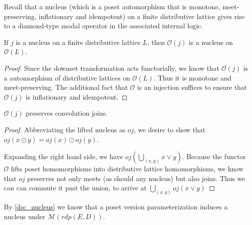\documentclass[hoptionsi,review,format=sigplan]{acmart}
\theoremstyle{definition}
\newcommand{\Mcc}{\mathcal{M}}
\newcommand{\Oc}{\mathcal{O}}
\begin{document}
Recall that a nucleus (which is a poset automorphism that is monotone, meet-preserving, inflationary and idempotent) on a finite distributive lattice gives rise to a diamond-type modal operator in the associated internal logic.

\begin{lemma}
If \(j\) is a nucleus on a finite distributive lattice \(L\), then \(\Oc(j)\) is a nucleus on \(\Oc(L)\).
\end{lemma}

\begin{proof}
Since the downset transformation acts functorially, we know that \(\Oc(j)\) is a automorphism of distributive lattices on \(\Oc(L)\). Thus it is monotone and meet-preserving. The additional fact that \(\Oc\) is an injection suffices to ensure that \(\Oc(j)\) is inflationary and idempotent.
\end{proof}

\begin{lemma}
\(\Oc(j)\) preserves convolution joins.
\end{lemma}
\begin{proof}
Abbreviating the lifted nucleus as \(oj\), we desire to show that \(oj(x \odot y) = oj(x) \odot oj(y)\).

Expanding the right hand side, we have  \(oj(\bigcup_{(x,y)} x \vee y)\). Because the functor \(\Oc\) lifts poset homomorphisms into distributive lattice homomorphisms, we know that \(oj\) preserves not only meets (as should any nucleus) but also joins. Thus we can can commute it past the union, to arrive at \(\bigcup_{(x,y)} oj(x \vee y)\)

\end{proof}

By \ref{dsc_nucleus} we know that a poset version parameterization induces a nucleus under \(\Mcc(rdp(E,D))\).










\end{document}
